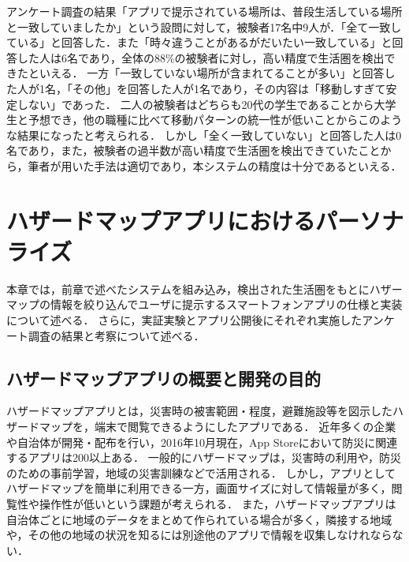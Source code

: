 \documentclass[a4paper]{jsarticle}
\begin{document}
アンケート調査の結果「アプリで提示されている場所は、普段生活している場所と一致していましたか」という設問に対して，被験者17名中9人が．「全て一致している」と回答した．また「時々違うことがあるがだいたい一致している」と回答した人は6名であり，全体の88\%の被験者に対し，高い精度で生活圏を検出できたといえる．
一方「一致していない場所が含まれてることが多い」と回答した人が1名，「その他」を回答した人が1名であり，その内容は「移動しすぎて安定しない」であった．
二人の被験者はどちらも20代の学生であることから大学生と予想でき，他の職種に比べて移動パターンの統一性が低いことからこのような結果になったと考えられる．
しかし「全く一致していない」と回答した人は0名であり，また，被験者の過半数が高い精度で生活圏を検出できていたことから，筆者が用いた手法は適切であり，本システムの精度は十分であるといえる．




\section{ハザードマップアプリにおけるパーソナライズ}
本章では，前章で述べたシステムを組み込み，検出された生活圏をもとにハザーマップの情報を絞り込んでユーザに提示するスマートフォンアプリの仕様と実装について述べる．
さらに，実証実験とアプリ公開後にそれぞれ実施したアンケート調査の結果と考察について述べる．

\subsection{ハザードマップアプリの概要と開発の目的}
ハザードマップアプリとは，災害時の被害範囲・程度，避難施設等を図示したハザードマップを，端末で閲覧できるようにしたアプリである．
近年多くの企業や自治体が開発・配布を行い，2016年10月現在，App Storeにおいて防災に関連するアプリは200以上ある．
一般的にハザードマップは，災害時の利用や，防災のための事前学習，地域の災害訓練などで活用される．
しかし，アプリとしてハザードマップを簡単に利用できる一方，画面サイズに対して情報量が多く，閲覧性や操作性が低いという課題が考えられる．
また，ハザードマップアプリは自治体ごとに地域のデータをまとめて作られている場合が多く，隣接する地域や，その他の地域の状況を知るには別途他のアプリで情報を収集しなけれならない．
\end{document}
